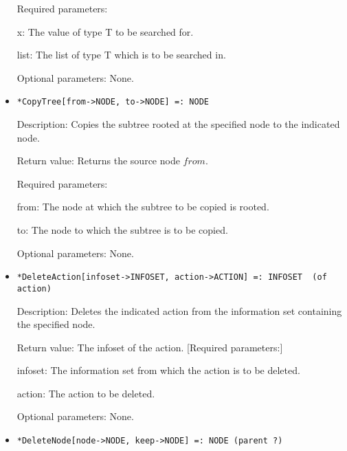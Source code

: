 \begin{itemize}
\item[Required parameters:]\hfil\null
	
\bd
\item	
[x:] The value of type T to be searched for.
\item
[list:] The list of type T which is to be searched in.
\ed

\item
[Optional parameters:] None.
\ed


\item
\protect \large \begin{verbatim}
*CopyTree[from->NODE, to->NODE] =: NODE
\end{verbatim}\normalsize

\bd
\item
[Description:] Copies the subtree rooted at the specified node to the
indicated node.
\item
[Return value:] Returns the source node $from$.
\item
[Required parameters:]\hfil\null

\bd
\item	
[from:] The node at which the subtree to be copied is rooted.
\item
[to:] The node to which the subtree is to be copied.
\ed

\item
[Optional parameters:] None.
\ed


\item
\protect \large \begin{verbatim}
*DeleteAction[infoset->INFOSET, action->ACTION] =: INFOSET  (of action)
\end{verbatim}\normalsize

\bd
\item
[Description:] Deletes the indicated action from the
information set containing the specified node.
\item
[Return value:] The infoset of the action.  [Required parameters:]\hfil\null
	
\bd
\item
[infoset:] The information set from which the action is to be deleted.
\item [action:] The action to be deleted.
\ed

\item
[Optional parameters:] None.
\ed

\item
\protect \large \begin{verbatim}
*DeleteNode[node->NODE, keep->NODE] =: NODE (parent ?)  
\end{verbatim}\normalsize


\end{itemize}
